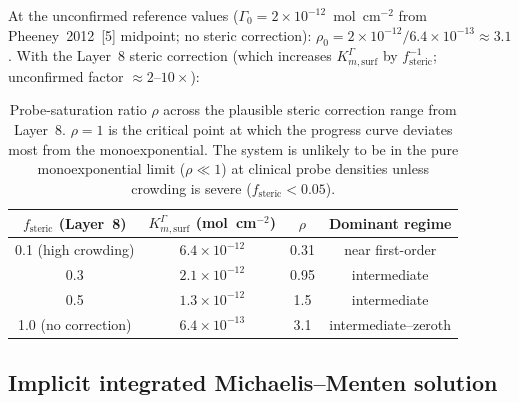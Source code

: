 \documentclass[10pt,a4paper]{article}
\numberwithin{equation}{section}
\newcommand{\cit}[1]{[#1]}
\newcommand{\Gz}{\Gamma_0}
\begin{document}
At the unconfirmed reference values ($\Gz = 2\times10^{-12}$~mol~cm$^{-2}$
from Pheeney~2012~\cit{5} midpoint; no steric correction):
$\rho_0 = 2\times10^{-12}/6.4\times10^{-13} \approx 3.1$.
With the Layer~8 steric correction (which increases $K_{m,\text{surf}}^\Gamma$
by $f_{\text{steric}}^{-1}$; unconfirmed factor $\approx 2$--$10\times$):

\begin{table}[H]
\centering
\small\renewcommand{\arraystretch}{1.25}
\begin{tabular}{@{}cccc@{}}
\toprule
$f_{\text{steric}}$ (Layer~8) &
$K_{m,\text{surf}}^\Gamma$ (mol~cm$^{-2}$) &
$\rho$ &
Dominant regime \\
\midrule
0.1 (high crowding) & $6.4\times10^{-12}$ & 0.31 & near first-order \\
0.3                 & $2.1\times10^{-12}$ & 0.95 & intermediate \\
0.5                 & $1.3\times10^{-12}$ & 1.5  & intermediate \\
1.0 (no correction) & $6.4\times10^{-13}$ & 3.1  & intermediate--zeroth \\
\bottomrule
\end{tabular}
\caption{Probe-saturation ratio $\rho$ across the plausible steric
correction range from Layer~8. $\rho = 1$ is the critical point at which
the progress curve deviates most from the monoexponential.
The system is unlikely to be in the pure monoexponential limit ($\rho \ll 1$)
at clinical probe densities unless crowding is severe ($f_{\text{steric}} < 0.05$).}
\label{tab:rho}
\end{table}

\subsection{Implicit integrated Michaelis--Menten solution}
\end{document}
